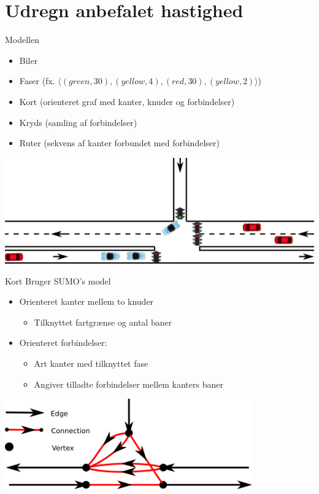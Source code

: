 \section{Udregn anbefalet hastighed}
\begin{frame}{Modellen}
\begin{itemize}
\item Biler
\item Faser (fx. $\langle(green, 30), (yellow, 4), (red, 30), (yellow, 2)\rangle$)
\item Kort (orienteret graf med kanter, knuder og forbindelser)
\item Kryds (samling af forbindelser)
\item Ruter (sekvens af kanter forbundet med forbindelser)
\end{itemize}

\includegraphics[width=1\textwidth]{../images/introNetworkSimple.png}
\end{frame}

\begin{frame}{Kort}
Bruger SUMO's model
\begin{itemize}
\item Orienteret kanter mellem to knuder
	\begin{itemize}
	\item Tilknyttet fartgrænse og antal baner
\end{itemize}
\item Orienteret forbindelser: 
	\begin{itemize}
	\item Art kanter med tilknyttet fase
	\item Angiver tilladte forbindelser mellem kanters baner
	\end{itemize}
\end{itemize}

\vspace{5mm}
\begin{center}
\includegraphics[width=0.8\textwidth]{../images/ConnectionNetwork.png}
\end{center}
\end{frame}

